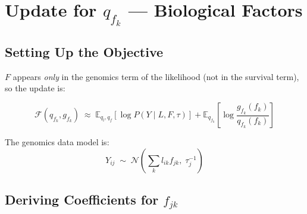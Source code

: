 \documentclass[11pt]{article}
\begin{document}
\section{Update for $q_{f_k}$ --- Biological Factors}\label{sec:update-F}

\subsection{Setting Up the Objective}

$F$ appears \emph{only} in the genomics term of the likelihood (not in the
survival term), so the update is:

\begin{equation}\label{eq:Fqf}
  \mathcal{F}(q_{f_k}, g_{f_k})
  \;\approx\;
  \mathbb{E}_{q_l,q_f}\!\left[\log P(Y \mid L, F, \tau)\right]
  + \mathbb{E}_{q_{f_k}}\!\left[\log\frac{g_{f_k}(f_k)}{q_{f_k}(f_k)}\right]
\end{equation}

The genomics data model is:
\begin{equation}\label{eq:genomics-data-model}
  Y_{ij} \;\sim\; \mathcal{N}\!\left(\sum_k l_{ik}f_{jk},\; \tau_j^{-1}\right)
\end{equation}

\subsection{Deriving Coefficients for $f_{jk}$}
\end{document}
